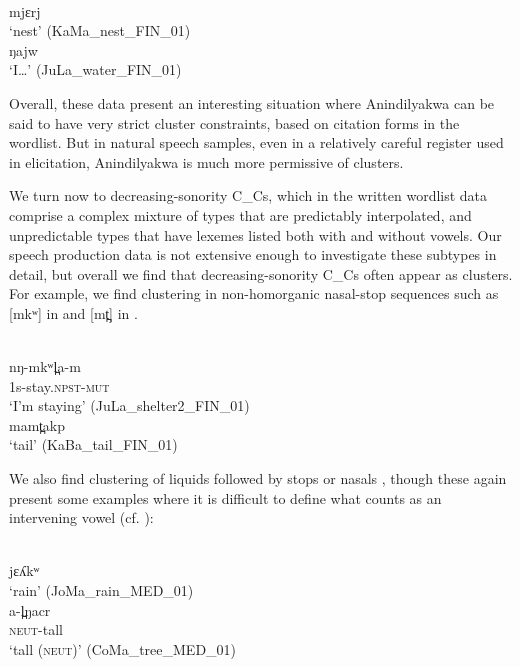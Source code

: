 \documentclass[output=paper,colorlinks,citecolor=brown]{langscibook}
\begin{document}
\ea\label{ex:mansfield:13}
\\
       mjɛrj\\
\glt   ‘nest’ (KaMa\_nest\_FIN\_01)
\ex\label{ex:mansfield:14}
\\
       ŋajw\\
\glt   ‘I…’ (JuLa\_water\_FIN\_01)\z

Overall, these data present an interesting situation where Anindilyakwa can be said to have very strict cluster constraints, based on citation forms in the wordlist. But in natural speech samples, even in a relatively careful register used in elicitation, Anindilyakwa is much more permissive of clusters.

We turn now to decreasing-sonority \textsc{C\_C}s, which in the written wordlist data comprise a complex mixture of types that are predictably interpolated, and unpredictable types that have lexemes listed both with and without vowels. Our speech production data is not extensive enough to investigate these subtypes in detail, but overall we find that decreasing-sonority \textsc{C\_C}s often appear as clusters. For example, we find clustering in non-homorganic nasal-stop sequences such as [mkʷ] in  and [mt̪] in .

\ea\label{ex:mansfield:15}
\\
       nŋ-mkʷl̪a-m\\
       1s-stay.\textsc{npst}{}-\textsc{mut}\\
\glt   ‘I’m staying’ (JuLa\_shelter2\_FIN\_01)
\ex\label{ex:mansfield:16}
\\
       mamt̪akp\\
\glt   ‘tail’ (KaBa\_tail\_FIN\_01)\z

We also find clustering of liquids followed by stops  or nasals , though these again present some examples where it is difficult to define what counts as an intervening vowel (cf. \citealt[25ff.]{vanEgmond2012}):

\ea\label{ex:mansfield:17}
\\
       jɛʎkʷ\\
\glt   ‘rain’ (JoMa\_rain\_MED\_01)
\ex\label{ex:mansfield:18}
 \\
       a-l̪ŋacr\\
       \textsc{neut}{}-tall\\
\glt   ‘tall (\textsc{neut})’ (CoMa\_tree\_MED\_01)\z
\end{document}
